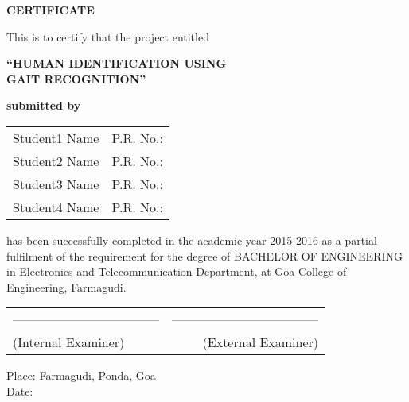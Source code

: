 \begin{center}
\begin{Huge}
{\bfseries CERTIFICATE}\\
\end{Huge}
\vspace{1cm}
{\normalsize This is to certify that the project entitled}\\
\vspace{0.3cm}
\begin{large}
{\bfseries ``HUMAN IDENTIFICATION USING \\GAIT RECOGNITION''}\\
\end{large}
\vspace{0.3cm}
{\bfseries submitted by}\\
\vspace{0.8cm}
\begin{table}[H]
\normalsize
\bfseries
\begin{center}
\begin{tabular}{ll}
Student1  Name \hspace{1cm} & P.R. No.:\\
Student2  Name & P.R. No.:\\
Student3  Name & P.R. No.:\\
Student4  Name & P.R. No.:\\
\end{tabular}
\end{center}
\end{table}
\end{center}
\noindent has been successfully completed in the academic year 2015-2016 as a partial fulfilment of the requirement for the degree of BACHELOR OF ENGINEERING in Electronics and Telecommunication Department, at Goa College of Engineering, Farmagudi.\\
\vspace{1.3cm}
\begin{table}[H]
\begin{tabular}{lr}
\noindent ----------------------------------- & \hspace{6cm} ----------------------------------- \\
(Internal Examiner) & (External Examiner)\\
\end{tabular}
\end{table}
\vspace{1.3cm}
\noindent Place: Farmagudi, Ponda, Goa\\
\noindent Date: 